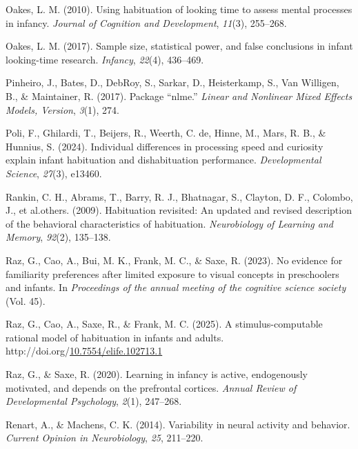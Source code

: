 \documentclass[10pt, letterpaper]{article}
\newenvironment{CSLReferences}%
  {}%
  {\par}
\begin{document}
\begin{CSLReferences}{1}{0}
\leavevmode{}%
Oakes, L. M. (2010). Using habituation of looking time to assess mental
processes in infancy. \emph{Journal of Cognition and Development},
\emph{11}(3), 255--268.

\leavevmode{}%
Oakes, L. M. (2017). Sample size, statistical power, and false
conclusions in infant looking-time research. \emph{Infancy},
\emph{22}(4), 436--469.

\leavevmode{}%
Pinheiro, J., Bates, D., DebRoy, S., Sarkar, D., Heisterkamp, S., Van
Willigen, B., \& Maintainer, R. (2017). Package {``nlme.''} \emph{Linear
and Nonlinear Mixed Effects Models, Version}, \emph{3}(1), 274.

\leavevmode{}%
Poli, F., Ghilardi, T., Beijers, R., Weerth, C. de, Hinne, M., Mars, R.
B., \& Hunnius, S. (2024). Individual differences in processing speed
and curiosity explain infant habituation and dishabituation performance.
\emph{Developmental Science}, \emph{27}(3), e13460.

\leavevmode{}%
Rankin, C. H., Abrams, T., Barry, R. J., Bhatnagar, S., Clayton, D. F.,
Colombo, J., et al.others. (2009). Habituation revisited: An updated and
revised description of the behavioral characteristics of habituation.
\emph{Neurobiology of Learning and Memory}, \emph{92}(2), 135--138.

\leavevmode{}%
Raz, G., Cao, A., Bui, M. K., Frank, M. C., \& Saxe, R. (2023). No
evidence for familiarity preferences after limited exposure to visual
concepts in preschoolers and infants. In \emph{Proceedings of the annual
meeting of the cognitive science society} (Vol. 45).

\leavevmode{}%
Raz, G., Cao, A., Saxe, R., \& Frank, M. C. (2025). A
stimulus-computable rational model of habituation in infants and adults.
http://doi.org/\href{https://doi.org/10.7554/elife.102713.1}{10.7554/elife.102713.1}

\leavevmode{}%
Raz, G., \& Saxe, R. (2020). Learning in infancy is active, endogenously
motivated, and depends on the prefrontal cortices. \emph{Annual Review
of Developmental Psychology}, \emph{2}(1), 247--268.

\leavevmode{}%
Renart, A., \& Machens, C. K. (2014). Variability in neural activity and
behavior. \emph{Current Opinion in Neurobiology}, \emph{25}, 211--220.


\end{CSLReferences}
\end{document}
